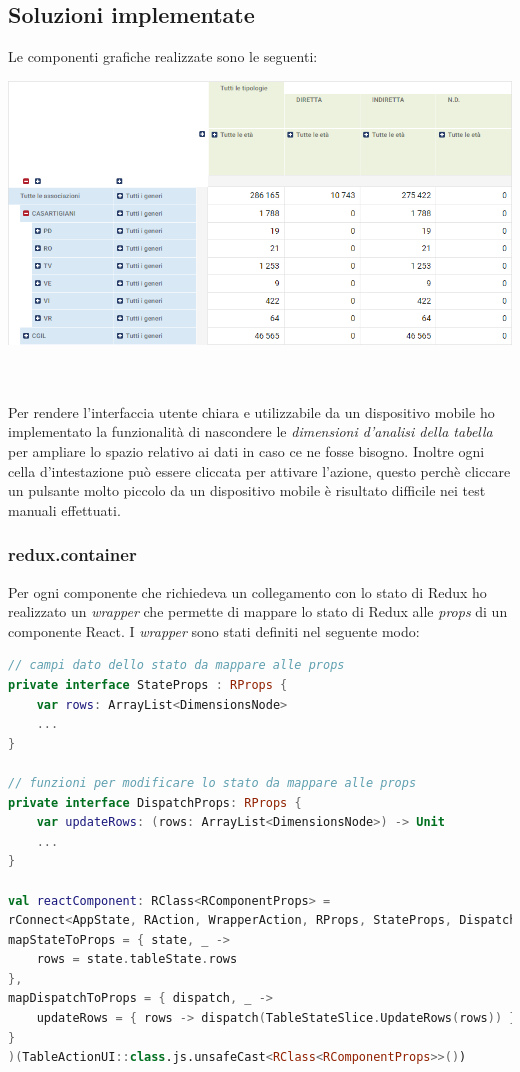 \subsection{Soluzioni implementate}
Le componenti grafiche realizzate sono le seguenti: \\
\begin{minipage}{\linewidth}
\includegraphics[scale=0.60]{./immagini/table-pivot.png}
\end{minipage}
\\
\\
Per rendere l'interfaccia utente chiara e utilizzabile da un dispositivo mobile ho implementato la funzionalità di nascondere le \emph{dimensioni d'analisi della tabella} per ampliare lo spazio relativo ai dati in caso ce ne fosse bisogno. Inoltre ogni cella d'intestazione può essere cliccata per attivare l'azione, questo perchè cliccare un pulsante molto piccolo da un dispositivo mobile è risultato difficile nei test manuali effettuati.

\subsubsection{redux.container}
Per ogni componente che richiedeva un collegamento con lo stato di Redux ho realizzato un \emph{wrapper} che permette di mappare lo stato di Redux alle \emph{props} di un componente React. I \emph{wrapper} sono stati definiti nel seguente modo:
\begin{lstlisting}[caption={ReduxContainer}, label={lst:reduxcontainer}, language=Kotlin]
// campi dato dello stato da mappare alle props
private interface StateProps : RProps {
	var rows: ArrayList<DimensionsNode>
	...
}

// funzioni per modificare lo stato da mappare alle props
private interface DispatchProps: RProps {
	var updateRows: (rows: ArrayList<DimensionsNode>) -> Unit
	...
}

val reactComponent: RClass<RComponentProps> =
rConnect<AppState, RAction, WrapperAction, RProps, StateProps, DispatchProps, RComponentProps>(
mapStateToProps = { state, _ ->
	rows = state.tableState.rows
},
mapDispatchToProps = { dispatch, _ ->
	updateRows = { rows -> dispatch(TableStateSlice.UpdateRows(rows)) }
}
)(TableActionUI::class.js.unsafeCast<RClass<RComponentProps>>())
\end{lstlisting}

